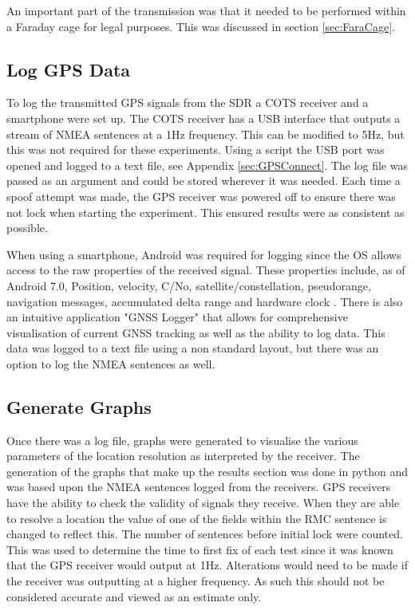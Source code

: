An important part of the transmission was that it needed to be performed within a Faraday cage for legal purposes. This was discussed in section \ref{sec:FaraCage}.

\subsection{Log GPS Data}
To log the transmitted GPS signals from the SDR a COTS receiver and a smartphone were set up. The COTS receiver has a USB interface that outputs a stream of NMEA
sentences at a 1Hz frequency. This can be modified to 5Hz, but this was not required for these experiments. Using a script the USB port was opened and logged to a text
file, see Appendix \ref{sec:GPSConnect}. The log file was passed as an argument and could be stored wherever it was needed. Each time a spoof attempt was made, the GPS
receiver was powered off to ensure there was not lock when starting the experiment. This ensured results were as consistent as possible.

When using a smartphone, Android was required for logging since the OS allows access to the raw properties of the received signal. These properties include, as of Android
7.0, Position, velocity, C/No, satellite/constellation, pseudorange, navigation messages, accumulated delta range and hardware clock \cite{RN39}.
There is also an intuitive application
"GNSS Logger" that allows for comprehensive visualisation of current GNSS tracking as well as the ability to log data. This data was logged to a text file using a non
standard layout, but there was an option to log the NMEA sentences as well.  

\subsection{Generate Graphs}
Once there was a log file, graphs were generated to visualise the various parameters of the location resolution as interpreted by the receiver. 
The generation of the graphs that make up the results section was done in python and was based upon the NMEA sentences logged from the receivers. GPS receivers have the
ability to check the validity of signals they receive. When they are able to resolve a location the value of one of the fields within the RMC sentence is changed to
reflect this. The number of sentences before initial lock were counted. This was
used to determine the time to first fix of each test since it was known that the GPS receiver would output at 1Hz. Alterations would need to be made if the receiver was
outputting at a higher frequency. As such this should not be considered accurate and viewed as an estimate only.

